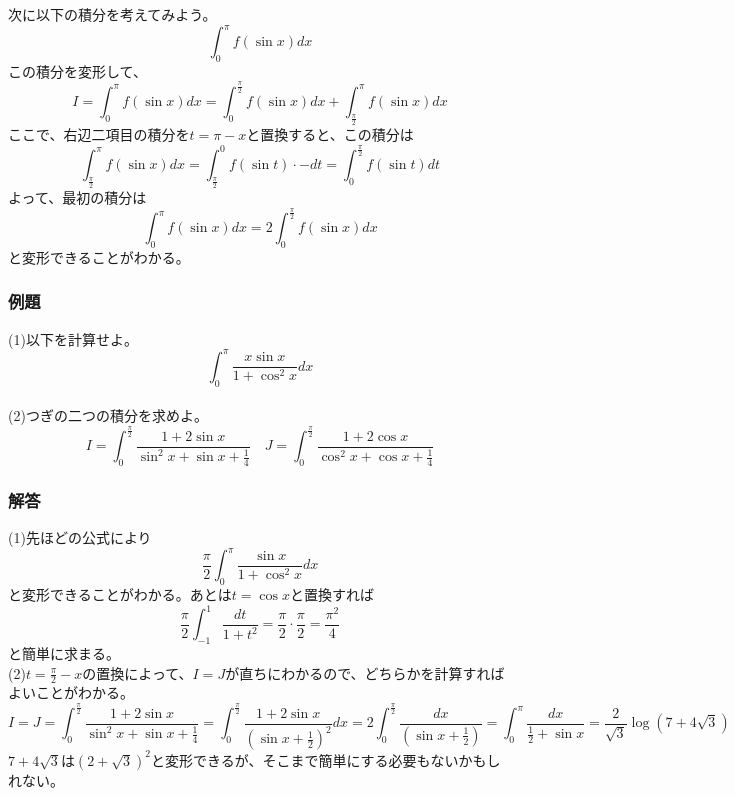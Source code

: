 \documentclass[a4j,dvipdfmx]{jsarticle}
\begin{document}
次に以下の積分を考えてみよう。
\begin{equation*}
    \int_0^\pi f(\sin x)dx
\end{equation*}
この積分を変形して、
\begin{equation*}
    I=\int_0^\pi  f(\sin x)dx=\int_0^{\frac{\pi}{2}}f(\sin x)dx+\int_{\frac{\pi}{2}}^{\pi}f(\sin x)dx
\end{equation*}
ここで、右辺二項目の積分を$t=\pi-x$と置換すると、この積分は
\begin{equation*}
    \int_{\frac{\pi}{2}}^{\pi}f(\sin x)dx=\int_{\frac{\pi}{2}}^{0}f(\sin t)\cdot -dt=\int_0^{\frac{\pi}{2}}f(\sin t)dt
\end{equation*}
よって、最初の積分は
\begin{equation*}
    \int_0^\pi f(\sin x)dx=2\int_{0}^{\frac{\pi}{2}}f(\sin x)dx
\end{equation*}
と変形できることがわかる。

\subsubsection*{例題}
(1)以下を計算せよ。
\begin{equation*}
    \int_0^\pi \frac{x\sin x}{1+\cos^2 x}dx
\end{equation*}\\

(2)つぎの二つの積分を求めよ。
\begin{equation*}
    I=\int_0^{\frac{\pi}{2}} \frac{1+2\sin x}{\sin^2 x+\sin x+\frac{1}{4}}\quad J=\int_0^{\frac{\pi}{2}} \frac{1+2\cos x}{\cos^2 x+\cos x+\frac{1}{4}}
\end{equation*}
\subsubsection*{解答}
(1)先ほどの公式により
\begin{equation*}
    \frac{\pi}{2}\int_0^\pi \frac{\sin x}{1+\cos^2 x}dx
\end{equation*}
と変形できることがわかる。あとは$t=\cos x$と置換すれば
\begin{equation*}
    \frac{\pi}{2}\int_{-1}^{1}\frac{dt}{1+t^2}=\frac{\pi}{2}\cdot\frac{\pi}{2}=\frac{\pi^2}{4}
\end{equation*}
と簡単に求まる。\\

(2)$t=\frac{\pi}{2}-x$の置換によって、$I=J$が直ちにわかるので、どちらかを計算すればよいことがわかる。
\begin{equation*}
    I=J=\int_0^{\frac{\pi}{2}} \frac{1+2\sin x}{\sin^2 x+\sin x+\frac{1}{4}}=\int_0^{\frac{\pi}{2}}\frac{1+2\sin x}{(\sin x+\frac{1}{2})^2}dx=2\int_0^{\frac{\pi}{2}}\frac{dx}{(\sin x+\frac{1}{2})}=\int_0^\pi \frac{dx}{\frac{1}{2}+\sin x}=\frac{2}{\sqrt{3}}\log(7+4\sqrt{3})
\end{equation*}
$7+4\sqrt{3}$は$(2+\sqrt{3})^2$と変形できるが、そこまで簡単にする必要もないかもしれない。
\end{document}
